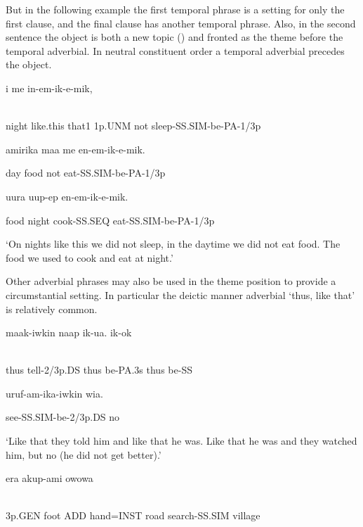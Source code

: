 But in the following example the first temporal phrase is a setting for only the first clause, and the final clause has another temporal phrase. Also, in the second sentence the object is both a new topic () and fronted as the theme before the temporal adverbial. In neutral constituent order a temporal adverbial precedes the object. 

\ea%
\label{ex:x1703}
\gll {}  i  me  in-em-ik-e-mik, \\
      \\
\glt
\z

night  like.this  that1  1p.UNM  not  sleep-SS.SIM-be-PA-1/3p

amirika  maa  me  en-em-ik-e-mik.

day  food  not  eat-SS.SIM-be-PA-1/3p

  uura  uup-ep  en-em-ik-e-mik.

food  night  cook-SS.SEQ  eat-SS.SIM-be-PA-1/3p

`On nights like this we did not sleep, in the daytime we did not eat food. The food we used to cook and eat at night.'

Other adverbial phrases may also be used in the theme position to provide a circumstantial setting. In particular the deictic manner adverbial  `thus, like that' is relatively common.

\ea%
\label{ex:x1917}
\gll {}  maak-iwkin  naap  ik-ua.    ik-ok  \\
      \\
\glt
\z

thus  tell-2/3p.DS  thus  be-PA.3s  thus  be-SS  

uruf-am-ika-iwkin  wia.

see-SS.SIM-be-2/3p.DS  no

`Like that they told him and like that he was. Like that he was and they watched him, but no (he did not get better).'

\ea%
\label{ex:x1918}
\gll {}    era  akup-ami  owowa  \\
      \\
\glt
\z

3p.GEN  foot  ADD  hand=INST  road  search-SS.SIM  village  

